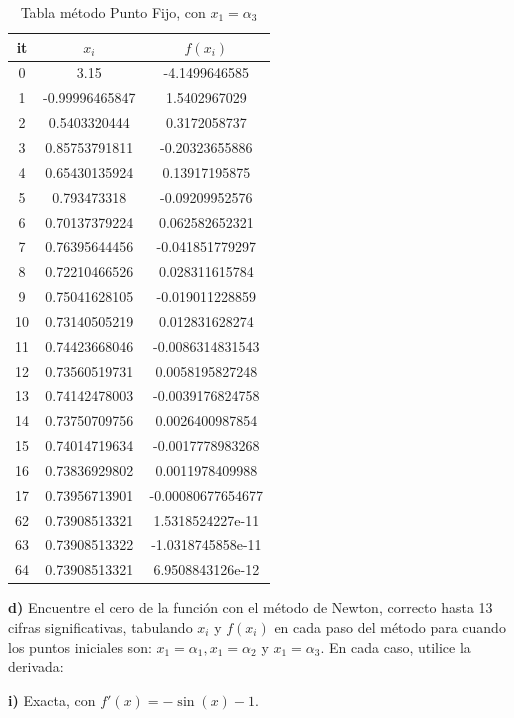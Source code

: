 \documentclass{article} %
\begin{document}
\begin{table}[H]
    \centering
    \begin{tabular}{|c|c|c|}
    \hline
it & $x_i$ & $f(x_i)$\\
\hline
0 & 3.15 & -4.1499646585\\
1 & -0.99996465847 & 1.5402967029\\
2 & 0.5403320444 & 0.3172058737\\
3 & 0.85753791811 & -0.20323655886\\
4 & 0.65430135924 & 0.13917195875\\
5 & 0.793473318 & -0.09209952576\\
6 & 0.70137379224 & 0.062582652321\\
7 & 0.76395644456 & -0.041851779297\\
8 & 0.72210466526 & 0.028311615784\\
9 & 0.75041628105 & -0.019011228859\\
10 & 0.73140505219 & 0.012831628274\\
11 & 0.74423668046 & -0.0086314831543\\
12 & 0.73560519731 & 0.0058195827248\\
13 & 0.74142478003 & -0.0039176824758\\
14 & 0.73750709756 & 0.0026400987854\\
15 & 0.74014719634 & -0.0017778983268\\
16 & 0.73836929802 & 0.0011978409988\\
17 & 0.73956713901 & -0.00080677654677\\
62 & 0.73908513321 & 1.5318524227e-11\\
63 & 0.73908513322 & -1.0318745858e-11\\
64 & 0.73908513321 & 6.9508843126e-12\\
\hline
\end{tabular}
    \caption{Tabla método Punto Fijo, con $x_1 = \alpha_3$}
    \label{tab5}
\end{table}
\begin{center}
\end{center}

\textbf{d)} Encuentre el cero de la función con el método de Newton, correcto hasta 13 cifras significativas, tabulando $x_i$ y $f(x_i)$ en cada paso del método para cuando los puntos iniciales son: $x_1 =\alpha_1, x_1 =\alpha_2$ y $x_1 = \alpha_3$. En cada caso, utilice la derivada:

\textbf{i)} Exacta, con $f'(x) = -\sin{(x)} -1$.
\end{document}
